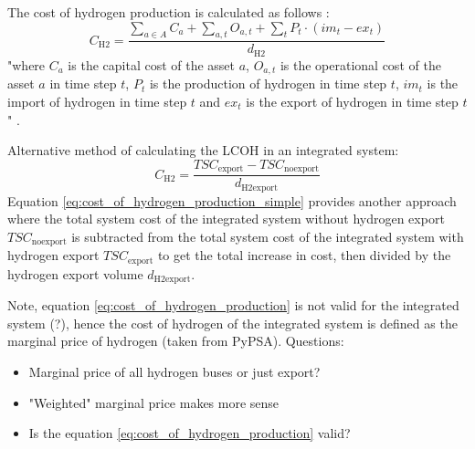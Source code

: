 The cost of hydrogen production is calculated as follows \cite{Zeyen2022}:
\begin{equation}
    \label{eq:cost_of_hydrogen_production}
    C_\mathrm{H2}= \frac{\sum \limits_{a\in A}^{} C_a + \sum \limits_{a,t} O_{a,t} + \sum \limits_{t} P_t \cdot (im_t - ex_t)   }{d_\mathrm{H2}}
\end{equation}
"where $C_a$ is the capital cost of the asset $a$, $O_{a,t}$ is the operational cost of the asset $a$ in time step $t$, $P_t$ is the production of hydrogen in time step $t$, $im_t$ is the import of hydrogen in time step $t$ and $ex_t$ is the export of hydrogen in time step $t$" \cite{Zeyen2022}.


Alternative method of calculating the LCOH in an integrated system:
\begin{equation}
    \label{eq:cost_of_hydrogen_production_simple}
    C_\mathrm{H2}=\frac{TSC_\mathrm{export}-TSC_\mathrm{noexport}}{d_\mathrm{H2export}}
\end{equation}
Equation \ref{eq:cost_of_hydrogen_production_simple} provides another approach where the total system cost of the integrated system without hydrogen export $TSC_\mathrm{noexport}$ is subtracted from the total system cost of the integrated system with hydrogen export $TSC_\mathrm{export}$ to get the total increase in cost, then divided by the hydrogen export volume $d_\mathrm{H2export}$.

Note, equation \ref{eq:cost_of_hydrogen_production} is not valid for the integrated system (?),
hence the cost of hydrogen of the integrated system is defined as the marginal price of hydrogen (taken from PyPSA).
Questions:
\begin{itemize}
    \item Marginal price of all hydrogen buses or just export?
    \item "Weighted" marginal price makes more sense
    \item Is the equation \ref{eq:cost_of_hydrogen_production} valid?
\end{itemize}


